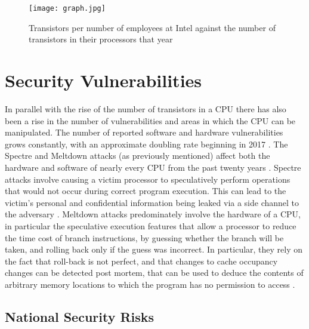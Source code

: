 \begin{figure}
	\texttt{[image: graph.jpg]}
	\caption{Transistors per number of employees at Intel against the number of transistors in their processors that year \cite{RN22, RN23, RN24, RN25, RN26}}
	\label{fig:transistor_graph}
\end{figure}


\section{Security Vulnerabilities}

	In parallel with the rise of the number of transistors in a CPU there has also been a rise in the number of vulnerabilities and areas in which the CPU can be manipulated. The number of reported software and hardware vulnerabilities grows constantly, with an approximate doubling rate beginning in 2017 \cite{RN17}. The Spectre and Meltdown attacks (as previously mentioned) affect both the hardware and software of nearly every CPU from the past twenty years \cite{RN15}. Spectre attacks involve causing a victim processor to speculatively perform operations that would not occur during correct program execution. This can lead to the victim’s personal and confidential information being leaked via a side channel to the adversary \cite{RN16}. Meltdown attacks predominately involve the hardware of a CPU, in particular the speculative execution features that allow a processor to reduce the time cost of branch instructions, by guessing whether the branch will be taken, and rolling back only if the guess was incorrect. In particular, they rely on the fact that roll-back is not perfect, and that changes to cache occupancy changes can be detected post mortem, that can be used to deduce the contents of arbitrary memory locations to which the program has no permission to access \cite{RN3}.



\subsection{National Security Risks}

